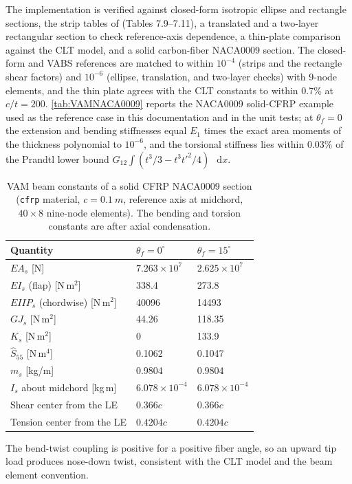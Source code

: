 \documentclass[10pt]{article}
\newcommand{\diff}{\mathop{}\!\tn{d}} %
\newcommand{\tn}[1]{\textrm{#1}}
\begin{document}
The implementation is verified against closed-form isotropic ellipse and rectangle sections, the strip tables of \citet[Ch.~7]{Hodges2006} (Tables 7.9--7.11), a translated and a two-layer rectangular section to check reference-axis dependence, a thin-plate comparison against the \ac{CLT} model, and a solid carbon-fiber NACA0009 section.
The closed-form and \ac{VABS} references are matched to within $10^{-4}$ (strips and the rectangle shear factors) and $10^{-6}$ (ellipse, translation, and two-layer checks) with 9-node elements, and the thin plate agrees with the \ac{CLT} constants to within 0.7\% at $c/t = 200$.
\autoref{tab:VAMNACA0009} reports the NACA0009 solid-\ac{CFRP} example used as the reference case in this documentation and in the unit tests; at $\theta_f = 0$ the extension and bending stiffnesses equal $E_1$ times the exact area moments of the thickness polynomial to $10^{-6}$, and the torsional stiffness lies within 0.03\% of the Prandtl lower bound $G_{12}\int (t^3/3 - t^3 t'^2/4)\,\diff x$.
\begin{table}[H]
\centering
\caption{VAM beam constants of a solid \ac{CFRP} NACA0009 section (\texttt{cfrp} material, $c = \SI{0.1}{m}$, reference axis at midchord, $40\times8$ nine-node elements). The bending and torsion constants are after axial condensation.}
\label{tab:VAMNACA0009}
\begin{tabular}{lll}
\hline
Quantity & $\theta_f = 0^\circ$ & $\theta_f = 15^\circ$ \\
\hline
$EA_s$ [N] & $7.263\times10^{7}$ & $2.625\times10^{7}$ \\
$EI_s$ (flap) [N\,m$^2$] & 338.4 & 273.8 \\
$EIIP_s$ (chordwise) [N\,m$^2$] & 40096 & 14493 \\
$GJ_s$ [N\,m$^2$] & 44.26 & 118.35 \\
$K_s$ [N\,m$^2$] & 0 & 133.9 \\
$\hat S_{55}$ [N\,m$^4$] & 0.1062 & 0.1047 \\
$m_s$ [kg/m] & 0.9804 & 0.9804 \\
$I_s$ about midchord [kg\,m] & $6.078\times10^{-4}$ & $6.078\times10^{-4}$ \\
Shear center from the \ac{LE} & $0.366c$ & $0.366c$ \\
Tension center from the \ac{LE} & $0.4204c$ & $0.4204c$ \\
\hline
\end{tabular}
\end{table}
The bend-twist coupling is positive for a positive fiber angle, so an upward tip load produces nose-down twist, consistent with the \ac{CLT} model and the beam element convention.
\end{document}

